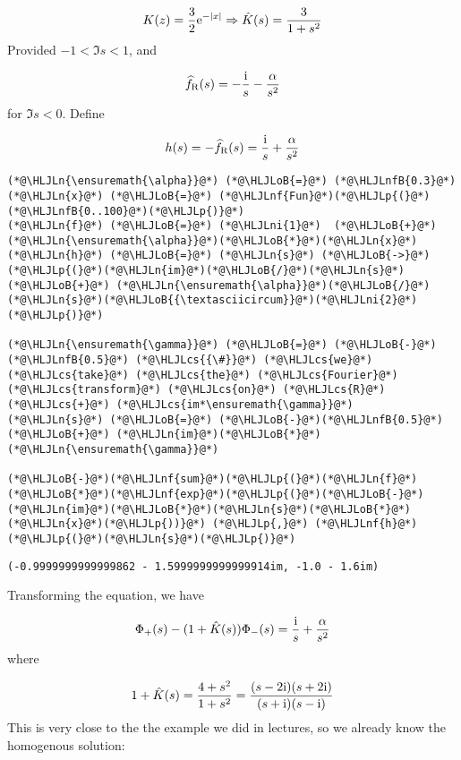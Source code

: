 \documentclass[12pt,landscape]{article}
\newcommand{\HLJLn}[1]{#1}
\newcommand{\HLJLnf}[1]{\textcolor[RGB]{66,102,213}{#1}}
\newcommand{\HLJLnfB}[1]{\textcolor[RGB]{59,151,46}{#1}}
\newcommand{\HLJLni}[1]{\textcolor[RGB]{59,151,46}{#1}}
\newcommand{\HLJLoB}[1]{\textcolor[RGB]{102,102,102}{\textbf{#1}}}
\newcommand{\HLJLp}[1]{#1}
\newcommand{\HLJLcs}[1]{\textcolor[RGB]{153,153,119}{\textit{#1}}}
\def\I{ {\rm i} }
\def\E{ {\rm e} }
\begin{document}
{\[
K(z) =  {3\over 2} \E^{-|x|} \Rightarrow \hat K(s) = {3 \over 1+s^2}
\]
Provided $-1 < \Im s < 1$, and

\[
\widehat f_{\rm R}(s) = -{\I \over s} - {\alpha \over s^2}
\]
for $\Im s < 0$.  Define

\[
h(s) = - \widehat f_{\rm R}(s) = {\I \over s} + {\alpha \over s^2}
\]

\begin{lstlisting}
(*@\HLJLn{\ensuremath{\alpha}}@*) (*@\HLJLoB{=}@*) (*@\HLJLnfB{0.3}@*)
(*@\HLJLn{x}@*) (*@\HLJLoB{=}@*) (*@\HLJLnf{Fun}@*)(*@\HLJLp{(}@*)(*@\HLJLnfB{0..100}@*)(*@\HLJLp{)}@*)
(*@\HLJLn{f}@*) (*@\HLJLoB{=}@*) (*@\HLJLni{1}@*)  (*@\HLJLoB{+}@*) (*@\HLJLn{\ensuremath{\alpha}}@*)(*@\HLJLoB{*}@*)(*@\HLJLn{x}@*)
(*@\HLJLn{h}@*) (*@\HLJLoB{=}@*) (*@\HLJLn{s}@*) (*@\HLJLoB{->}@*) (*@\HLJLp{(}@*)(*@\HLJLn{im}@*)(*@\HLJLoB{/}@*)(*@\HLJLn{s}@*) (*@\HLJLoB{+}@*) (*@\HLJLn{\ensuremath{\alpha}}@*)(*@\HLJLoB{/}@*)(*@\HLJLn{s}@*)(*@\HLJLoB{{\textasciicircum}}@*)(*@\HLJLni{2}@*)(*@\HLJLp{)}@*)

(*@\HLJLn{\ensuremath{\gamma}}@*) (*@\HLJLoB{=}@*) (*@\HLJLoB{-}@*)(*@\HLJLnfB{0.5}@*) (*@\HLJLcs{{\#}}@*) (*@\HLJLcs{we}@*) (*@\HLJLcs{take}@*) (*@\HLJLcs{the}@*) (*@\HLJLcs{Fourier}@*) (*@\HLJLcs{transform}@*) (*@\HLJLcs{on}@*) (*@\HLJLcs{R}@*) (*@\HLJLcs{+}@*) (*@\HLJLcs{im*\ensuremath{\gamma}}@*)
(*@\HLJLn{s}@*) (*@\HLJLoB{=}@*) (*@\HLJLoB{-}@*)(*@\HLJLnfB{0.5}@*) (*@\HLJLoB{+}@*) (*@\HLJLn{im}@*)(*@\HLJLoB{*}@*)(*@\HLJLn{\ensuremath{\gamma}}@*)

(*@\HLJLoB{-}@*)(*@\HLJLnf{sum}@*)(*@\HLJLp{(}@*)(*@\HLJLn{f}@*)(*@\HLJLoB{*}@*)(*@\HLJLnf{exp}@*)(*@\HLJLp{(}@*)(*@\HLJLoB{-}@*)(*@\HLJLn{im}@*)(*@\HLJLoB{*}@*)(*@\HLJLn{s}@*)(*@\HLJLoB{*}@*)(*@\HLJLn{x}@*)(*@\HLJLp{))}@*) (*@\HLJLp{,}@*) (*@\HLJLnf{h}@*)(*@\HLJLp{(}@*)(*@\HLJLn{s}@*)(*@\HLJLp{)}@*)
\end{lstlisting}

\begin{lstlisting}
(-0.9999999999999862 - 1.5999999999999914im, -1.0 - 1.6im)
\end{lstlisting}


Transforming the equation, we have

\[
\Phi_+(s) - (1 + \hat K(s)) \Phi_-(s)  = {\I \over s} + {\alpha \over s^2}
\]
where

\[
1 + \hat K(s) = {4 + s^2 \over 1 + s^2} = {(s-2 \I) (s+2 \I) \over (s+\I)(s-\I)}
\]
This is very close to the the example we did in lectures, so we already know the homogenous solution:

}
\end{document}
